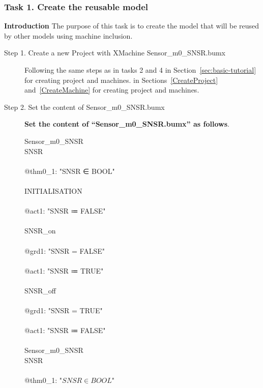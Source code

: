 \subsubsection{Task 1. Create the reusable model}
\textbf{Introduction} The purpose of this task is to create the model that will be reused by other models using machine inclusion.
\begin{description}
\item[Step 1. Create a new Project with XMachine Sensor\_m0\_SNSR.bumx] 

Following the same steps as 
\ifplastex
in tasks 2 and 4 in Section~\ref{sec:basic-tutorial} for creating project and machines.
\else
in Sections~\ref{CreateProject} and~\ref{CreateMachine} for creating project and machines.
\fi

\item[Step 2. Set the content of Sensor\_m0\_SNSR.bumx] \textbf{Set the content of ``Sensor\_m0\_SNSR.bumx'' as follows}.
\begin{center}
	\begin{Bcode}
		\ifplastex
		\Bmachine{} Sensor_m0_SNSR\\
		\Bvariables{} SNSR\\
		\Binvariants\\
		@thm0_1: "SNSR ∈ BOOL" \Btheorem\\
		\Bevents\\
		INITIALISATION\\
		\Bbegin\\
		@act1: "SNSR ≔ FALSE"\\
		\Bend\\
		SNSR_on\\
		\Bwhen\\
		@grd1: "SNSR = FALSE"\\
		\Bthen\\
		@act1: "SNSR ≔ TRUE"\\
		\Bend\\
	    SNSR_off\\
	    \Bwhen\\
	    @grd1: "SNSR = TRUE"\\
	    \Bthen\\
	    @act1: "SNSR ≔ FALSE"\\
	    \Bend\\
		\Bend
		\else
		\Bmachine{} Sensor_m0_SNSR\\
		\Bvariables{} SNSR\\
		\Binvariants\\
		\Btab @thm0_1: "\(SNSR \in BOOL\)" \Btheorem\\

\end{Bcode}
\end{center}
\end{description}
